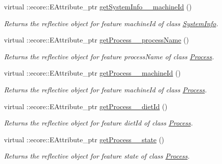 \begin{DoxyCompactItemize}
virtual ::ecore::EAttribute\_\-ptr \hyperlink{classIMS__Data_1_1IMS__DataPackage_a6182c5b8b112093be55ba443ed5038f9}{getSystemInfo\_\-\_\-machineId} ()
\begin{DoxyCompactList}\small\item\em Returns the reflective object for feature machineId of class \hyperlink{classIMS__Data_1_1SystemInfo}{SystemInfo}. \item\end{DoxyCompactList}\item 
virtual ::ecore::EAttribute\_\-ptr \hyperlink{classIMS__Data_1_1IMS__DataPackage_a4609bb65da5bff9945f4b3b29f93026a}{getProcess\_\-\_\-processName} ()
\begin{DoxyCompactList}\small\item\em Returns the reflective object for feature processName of class \hyperlink{classIMS__Data_1_1Process}{Process}. \item\end{DoxyCompactList}\item 
virtual ::ecore::EAttribute\_\-ptr \hyperlink{classIMS__Data_1_1IMS__DataPackage_a767175c27932998d9f8da5bef6996f10}{getProcess\_\-\_\-machineId} ()
\begin{DoxyCompactList}\small\item\em Returns the reflective object for feature machineId of class \hyperlink{classIMS__Data_1_1Process}{Process}. \item\end{DoxyCompactList}\item 
virtual ::ecore::EAttribute\_\-ptr \hyperlink{classIMS__Data_1_1IMS__DataPackage_ab229fda46346e6d6c0989160c8185305}{getProcess\_\-\_\-dietId} ()
\begin{DoxyCompactList}\small\item\em Returns the reflective object for feature dietId of class \hyperlink{classIMS__Data_1_1Process}{Process}. \item\end{DoxyCompactList}\item 
virtual ::ecore::EAttribute\_\-ptr \hyperlink{classIMS__Data_1_1IMS__DataPackage_a3b69f8d7d20df429f15a5a2d4ff04bb2}{getProcess\_\-\_\-state} ()
\begin{DoxyCompactList}\small\item\em Returns the reflective object for feature state of class \hyperlink{classIMS__Data_1_1Process}{Process}. \item\end{DoxyCompactList}\item 

\end{DoxyCompactItemize}
